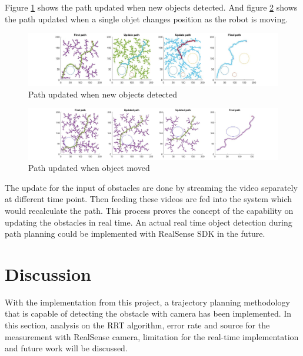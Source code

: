 \documentclass[
  oneside]{ubcthesis}
\begin{document}
Figure \ref{fig:figure10} shows the path updated when new objects detected. And figure \ref{fig:figure11} shows the path updated when a single objet changes position as the robot is moving.

\begin{figure}

{\centering \includegraphics[width=0.9\linewidth]{figures/10} 

}

\caption{Path updated when new objects detected}\label{fig:figure10}
\end{figure}



\begin{figure}

{\centering \includegraphics[width=0.9\linewidth]{figures/11} 

}

\caption{Path updated when object moved}\label{fig:figure11}
\end{figure}



The update for the input of obstacles are done by streaming the video separately at different time point. Then feeding these videos are fed into the system which would recalculate the path. This process proves the concept of the capability on updating the obstacles in real time. An actual real time object detection during path planning could be implemented with RealSense SDK in the future.

\hypertarget{discussion}{%
\chapter{Discussion}\label{discussion}}

With the implementation from this project, a trajectory planning methodology that is capable of detecting the obstacle with camera has been implemented. In this section, analysis on the RRT algorithm, error rate and source for the measurement with RealSense camera, limitation for the real-time implementation and future work will be discussed.
\end{document}
